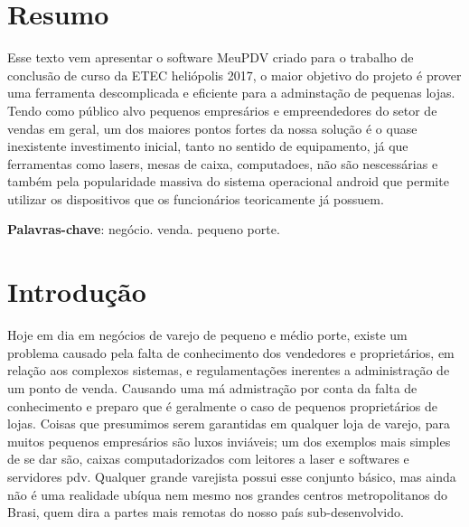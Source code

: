 \documentclass[12pt, openright, twoside, article, a4paper, english, brazil]{abntex2}
\begin{document}
\imprimircapa{}
\imprimirfolhaderosto{}

\chapter*{Resumo\label{resumo}}
Esse texto vem apresentar o software MeuPDV criado para o trabalho de conclusão
de curso da ETEC heliópolis 2017, o maior objetivo do projeto é prover uma
ferramenta descomplicada e eficiente para a adminstação de pequenas lojas. Tendo
como público alvo pequenos empresários e empreendedores do setor de vendas em
geral, um dos maiores pontos fortes da nossa solução é o quase inexistente
investimento inicial, tanto no sentido de equipamento, já que ferramentas como
lasers, mesas de caixa, computadoes, não são nescessárias e também pela
popularidade massiva do sistema operacional android que permite utilizar os
dispositivos que os funcionários teoricamente já possuem.

\vspace{\onelineskip}
\noindent
\textbf{Palavras-chave}: negócio. venda. pequeno porte.
\clearpage

\tableofcontents
\cleardoublepage
 
\textual
\chapter{Introdução}
Hoje em dia em negócios de varejo de pequeno e médio porte, existe um problema
causado pela falta de conhecimento dos vendedores e proprietários, em relação
aos complexos sistemas, e regulamentações inerentes a administração de um ponto
de venda. Causando uma má admistração por conta da falta de conhecimento e
preparo que é geralmente o caso de pequenos proprietários de
lojas. Coisas que presumimos serem garantidas em qualquer loja de varejo, para
muitos pequenos empresários são luxos inviáveis; um dos exemplos mais simples de
se dar são, caixas computadorizados com leitores a laser e softwares e
servidores \gls{pdv}. Qualquer grande varejista possui esse conjunto básico, mas
ainda não é uma realidade ubíqua nem mesmo nos grandes centros metropolitanos do
Brasi, quem  dira a partes mais remotas do nosso país sub-desenvolvido.  

\postextual
\clearpage
\printbibliography
\end{document}
